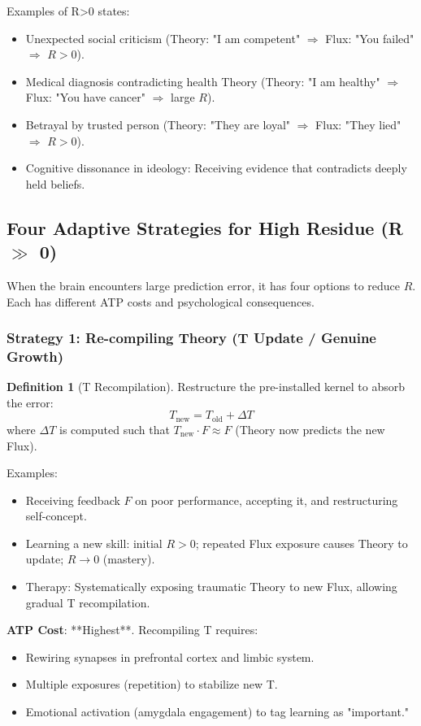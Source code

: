 \documentclass[11pt,oneside]{article}
\theoremstyle{definition}
\newtheorem{definition}[theorem]{Definition}
\begin{document}
Examples of R>0 states:
\begin{itemize}
  \item Unexpected social criticism (Theory: "I am competent" $\Rightarrow$ Flux: "You failed" $\Rightarrow$ $R > 0$).
  \item Medical diagnosis contradicting health Theory (Theory: "I am healthy" $\Rightarrow$ Flux: "You have cancer" $\Rightarrow$ large $R$).
  \item Betrayal by trusted person (Theory: "They are loyal" $\Rightarrow$ Flux: "They lied" $\Rightarrow$ $R > 0$).
  \item Cognitive dissonance in ideology: Receiving evidence that contradicts deeply held beliefs.
\end{itemize}

\subsection{Four Adaptive Strategies for High Residue (R \ensuremath{\gg} 0)}

When the brain encounters large prediction error, it has four options to reduce $R$. Each has different ATP costs and psychological consequences.

\subsubsection{Strategy 1: Re-compiling Theory (T Update / Genuine Growth)}

\begin{definition}[T Recompilation]
Restructure the pre-installed kernel to absorb the error:
\[
T_{\text{new}} = T_{\text{old}} + \Delta T
\]
where $\Delta T$ is computed such that $T_{\text{new}} \cdot F \approx F$ (Theory now predicts the new Flux).
\end{definition}

Examples:
\begin{itemize}
  \item Receiving feedback $F$ on poor performance, accepting it, and restructuring self-concept.
  \item Learning a new skill: initial $R > 0$; repeated Flux exposure causes Theory to update; $R \to 0$ (mastery).
  \item Therapy: Systematically exposing traumatic Theory to new Flux, allowing gradual T recompilation.
\end{itemize}

\textbf{ATP Cost}: **Highest**. Recompiling T requires:
\begin{itemize}
  \item Rewiring synapses in prefrontal cortex and limbic system.
  \item Multiple exposures (repetition) to stabilize new T.
  \item Emotional activation (amygdala engagement) to tag learning as "important."
\end{itemize}
\end{document}
